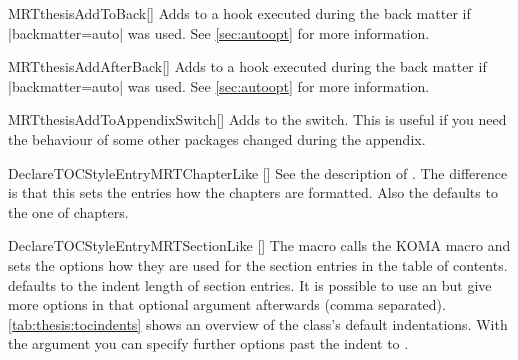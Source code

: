 \begin{describemacro}{MRTthesisAddToBack}[]
  Adds  to a hook executed during the back matter if
  \bverb|backmatter=auto| was used. See \autoref{sec:autoopt} for more
  information.
\end{describemacro}
\begin{describemacro}{MRTthesisAddAfterBack}[]
  Adds  to a hook executed during the back matter if
  \bverb|backmatter=auto| was used. See \autoref{sec:autoopt} for more
  information.
\end{describemacro}
\begin{describemacro}{MRTthesisAddToAppendixSwitch}[]
  Adds  to the  switch. This is useful if you need
  the behaviour of some other packages changed during the appendix.
\end{describemacro}
\begin{describemacro}{DeclareTOCStyleEntryMRTChapterLike}%
  [\hskip0pt\hskip0pt]
  See the description of . The difference
  is that this sets the entries how the chapters are formatted. Also the
   defaults to the one of chapters.
\end{describemacro}
\begin{describemacro}{DeclareTOCStyleEntryMRTSectionLike}%
  [\hskip0pt\hskip0pt]
  The macro calls the KOMA macro  and sets the options
  how they are used for the section entries in the table of contents.
   defaults to the indent length of section entries. It is possible
  to use an  but give more options in that optional argument
  afterwards (comma separated). \autoref{tab:thesis:tocindents} shows an
  overview of the class's default indentations. With the  argument
  you can specify further options past the indent to .
\end{describemacro}
